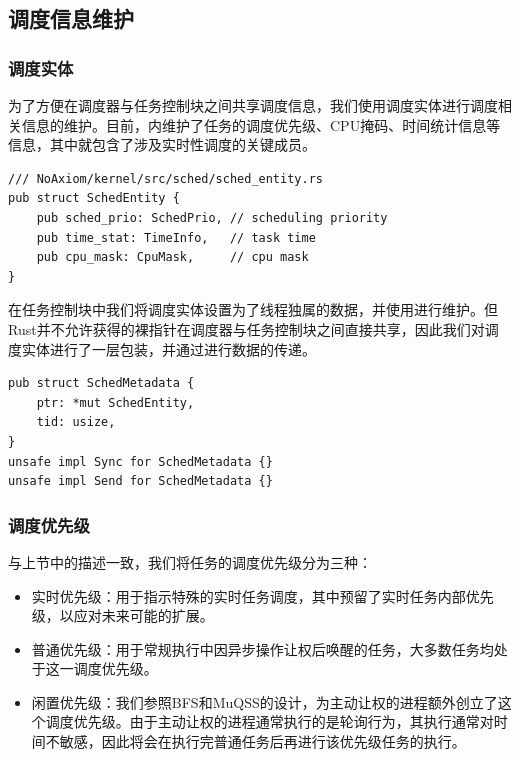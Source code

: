 \documentclass{article}
\begin{document}
\subsection{调度信息维护}

\subsubsection{调度实体}

为了方便在调度器与任务控制块之间共享调度信息，我们使用调度实体进行调度相关信息的维护。目前，内维护了任务的调度优先级、CPU掩码、时间统计信息等信息，其中就包含了涉及实时性调度的关键成员。

\begin{lstlisting}
/// NoAxiom/kernel/src/sched/sched_entity.rs
pub struct SchedEntity {
    pub sched_prio: SchedPrio, // scheduling priority
    pub time_stat: TimeInfo,   // task time
    pub cpu_mask: CpuMask,     // cpu mask
}
\end{lstlisting}

在任务控制块中我们将调度实体设置为了线程独属的数据，并使用进行维护。但Rust并不允许获得的裸指针在调度器与任务控制块之间直接共享，因此我们对调度实体进行了一层包装，并通过进行数据的传递。

\begin{lstlisting}
pub struct SchedMetadata {
    ptr: *mut SchedEntity,
    tid: usize,
}
unsafe impl Sync for SchedMetadata {}
unsafe impl Send for SchedMetadata {}
\end{lstlisting}

\subsubsection{调度优先级}

与上节中的描述一致，我们将任务的调度优先级分为三种：

\begin{itemize}
    \item 实时优先级：用于指示特殊的实时任务调度，其中预留了实时任务内部优先级，以应对未来可能的扩展。
    \item 普通优先级：用于常规执行中因异步操作让权后唤醒的任务，大多数任务均处于这一调度优先级。
    \item 闲置优先级：我们参照BFS和MuQSS的设计，为主动让权的进程额外创立了这个调度优先级。由于主动让权的进程通常执行的是轮询行为，其执行通常对时间不敏感，因此将会在执行完普通任务后再进行该优先级任务的执行。
\end{itemize}
\end{document}
